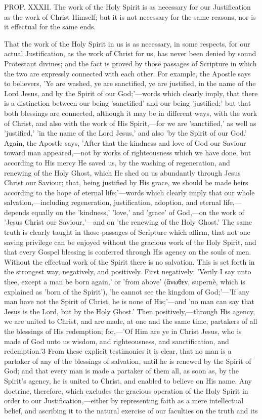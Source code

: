 \documentclass[
]{book}
\begin{document}
PROP. XXXII. The work of the Holy Spirit is as necessary for our Justification as the work of Christ Himself; but it is not necessary for the same reasons, nor is it effectual for the same ends.

That the work of the Holy Spirit in us is as necessary, in some respects, for our actual Justification, as the work of Christ for us, has never been denied by sound Protestant divines; and the fact is proved by those passages of Scripture in which the two are expressly connected with each other. For example, the Apostle says to believers, 'Ye are washed, ye are sanctified, ye are justified, in the name of the Lord Jesus, and by the Spirit of our God;'---words which clearly imply, that there is a distinction between our being 'sanctified' and our being 'justified;' but that both blessings are connected, although it may be in different ways, with the work of Christ, and also with the work of His Spirit,---for we are 'sanctified,' as well as 'justified,' 'in the name of the Lord Jesus,' and also 'by the Spirit of our God.' Again, the Apostle says, 'After that the kindness and love of God our Saviour toward man appeared,---not by works of righteousness which we have done, but according to His mercy He saved us, by the washing of regeneration, and renewing of the Holy Ghost, which He shed on us abundantly through Jesus Christ our Saviour; that, being justified by His grace, we should be made heirs according to the hope of eternal life;'---words which clearly imply that our whole salvation,---including regeneration, justification, adoption, and eternal life,---depends equally on the 'kindness,' 'love,' and 'grace' of God,---on the work of 'Jesus Christ our Saviour,'---and on 'the renewing of the Holy Ghost.' The same truth is clearly taught in those passages of Scripture which affirm, that not one saving privilege can be enjoyed without the gracious work of the Holy Spirit, and that every Gospel blessing is conferred through His agency on the souls of men. Without the effectual work of the Spirit there is no salvation. This is set forth in the strongest way, negatively, and positively. First negatively: 'Verily I say unto thee, except a man be born again,' or 'from above' (ἄνωθεν, supernè, which is explained as 'born of the Spirit'), 'he cannot see the kingdom of God;'---'If any man have not the Spirit of Christ, he is none of His;'---and 'no man can say that Jesus is the Lord, but by the Holy Ghost.' Then positively,---through His agency, we are united to Christ, and are made, at one and the same time, partakers of all the blessings of His redemption; for,---'Of Him are ye in Christ Jesus, who is made of God unto us wisdom, and righteousness, and sanctification, and redemption.'3 From these explicit testimonies it is clear, that no man is a partaker of any of the blessings of salvation, until he is renewed by the Spirit of God; and that every man is made a partaker of them all, as soon as, by the Spirit's agency, he is united to Christ, and enabled to believe on His name. Any doctrine, therefore, which excludes the gracious operation of the Holy Spirit in order to our Justification,---either by representing faith as a mere intellectual belief, and ascribing it to the natural exercise of our faculties on the truth and its 
\end{document}
